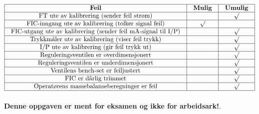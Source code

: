 






$$\vbox{\offinterlineskip
\halign{\strut
\vrule \quad\hfil # \ \hfil & 
\vrule \quad\hfil # \ \hfil & 
\vrule \quad\hfil # \ \hfil \vrule \cr
\noalign{\hrule}
%
{\bf Feil} & {\bf Mulig} & {\bf Umulig} \cr
%
\noalign{\hrule}
%
FT ute av kalibrering (sender feil strøm) &  & $\surd$ \cr
%
\noalign{\hrule}
%
FIC-inngang ute av kalibrering (tolker signal feil) & $\surd$ &  \cr
%
\noalign{\hrule}
%
FIC-utgang ute av kalibrering (sender feil mA-signal til I/P) &  & $\surd$ \cr
%
\noalign{\hrule}
%
Trykkmåler ute av kalibrering (viser feil trykk) &  & $\surd$ \cr
%
\noalign{\hrule}
%
I/P ute av kalibrering (gir feil trykk ut) &  & $\surd$ \cr
%
\noalign{\hrule}
%
Reguleringsventilen er overdimensjonert &  & $\surd$ \cr
%
\noalign{\hrule}
%
Reguleringsventilen er underdimensjonert &  & $\surd$ \cr
%
\noalign{\hrule}
%
Ventilens bench-set er feiljustert &  & $\surd$ \cr
%
\noalign{\hrule}
%
FIC er dårlig trimmet &  & $\surd$ \cr
%
\noalign{\hrule}
%
Operatørens massebalanseberegninger er feil &  & $\surd$ \cr
%
\noalign{\hrule}
} %
}$$ %







{\bf Denne oppgaven er ment for eksamen og ikke for arbeidsark!}.

